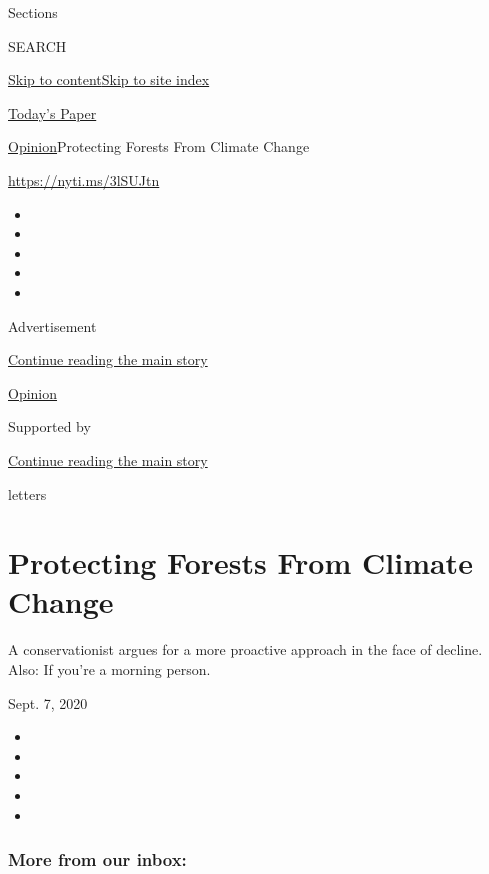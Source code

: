 Sections

SEARCH

\protect\hyperlink{site-content}{Skip to
content}\protect\hyperlink{site-index}{Skip to site index}

\href{https://myaccount.nytimes3xbfgragh.onion/auth/login?response_type=cookie\&client_id=vi}{}

\href{https://www.nytimes3xbfgragh.onion/section/todayspaper}{Today's
Paper}

\href{/section/opinion}{Opinion}\textbar{}Protecting Forests From
Climate Change

\url{https://nyti.ms/3lSUJtn}

\begin{itemize}
\item
\item
\item
\item
\item
\end{itemize}

Advertisement

\protect\hyperlink{after-top}{Continue reading the main story}

\href{/section/opinion}{Opinion}

Supported by

\protect\hyperlink{after-sponsor}{Continue reading the main story}

letters

\hypertarget{protecting-forests-from-climate-change}{%
\section{Protecting Forests From Climate
Change}\label{protecting-forests-from-climate-change}}

A conservationist argues for a more proactive approach in the face of
decline. Also: If you're a morning person.

Sept. 7, 2020

\begin{itemize}
\item
\item
\item
\item
\item
\end{itemize}

\hypertarget{more-from-our-inbox}{%
\subsubsection{More from our inbox:}\label{more-from-our-inbox}}


